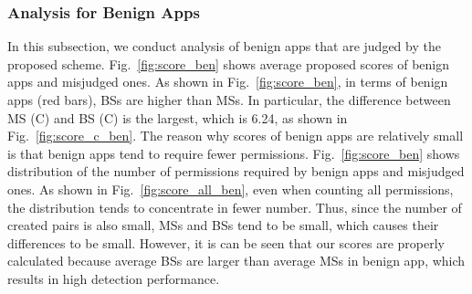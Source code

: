 \documentclass{ieeeaccess}
\newcommand{\myfigurename}{Fig.}
\begin{document}
\subsubsection{Analysis for Benign Apps} \label{subsec:analysis_benign}
In this subsection, we conduct analysis of benign apps that are judged by the proposed scheme.
\myfigurename~\ref{fig:score_ben} shows average proposed scores of benign apps and misjudged ones.
As shown in \myfigurename~\ref{fig:score_ben}, in terms of benign apps (red bars), BSs are higher than MSs.
In particular, the difference between MS (C) and BS (C) is the largest, which is 6.24, as shown in \myfigurename~\ref{fig:score_c_ben}.
The reason why scores of benign apps are relatively small is that benign apps tend to require fewer permissions.
\myfigurename~\ref{fig:score_ben} shows distribution of the number of permissions required by benign apps and misjudged ones.
As shown in \myfigurename~\ref{fig:score_all_ben}, even when counting all permissions, the distribution tends to concentrate in fewer number.
Thus, since the number of created pairs is also small, MSs and BSs tend to be small, which causes their differences to be small.
However, it is can be seen that our scores are properly calculated because average BSs are larger than average MSs in benign app, which results in high detection performance.
\end{document}
